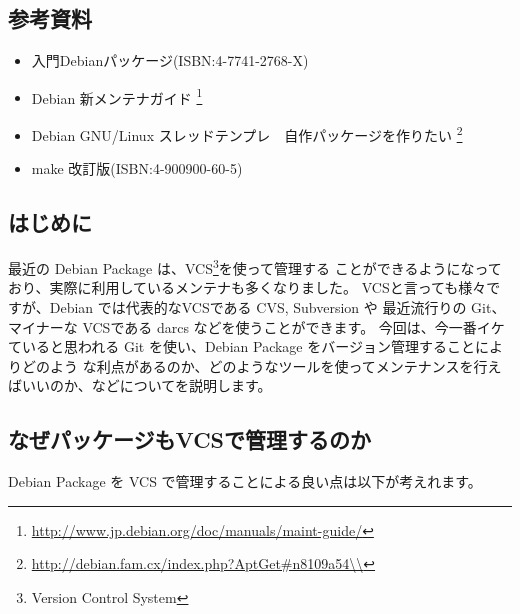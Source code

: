 \documentclass[mingoth,a4paper]{jsarticle}
\begin{document}

\subsection{参考資料}
\begin{itemize}
 
 \item  入門Debianパッケージ(ISBN:4-7741-2768-X)
 \item  Debian 新メンテナガイド
	\footnote{\url{http://www.jp.debian.org/doc/manuals/maint-guide/}}
 \item Debian GNU/Linux スレッドテンプレ　自作パッケージを作りたい
       \footnote{\url{http://debian.fam.cx/index.php?AptGet\#n8109a54\\}}
 \item make 改訂版(ISBN:4-900900-60-5)
\end{itemize}


\label{sec:vcsgit}

\subsection{はじめに}
最近の Debian Package は、VCS\footnote{Version Control System}を使って管理する
ことができるようになっており、実際に利用しているメンテナも多くなりました。
VCSと言っても様々ですが、Debian では代表的なVCSである CVS, Subversion や 最近流行りの Git、
マイナーな VCSである darcs などを使うことができます。
今回は、今一番イケていると思われる Git を使い、Debian Package をバージョン管理することによりどのよう
な利点があるのか、どのようなツールを使ってメンテナンスを行えばいいのか、などについてを説明します。

\subsection{なぜパッケージもVCSで管理するのか}
Debian Package を VCS で管理することによる良い点は以下が考えれます。
\end{document}
